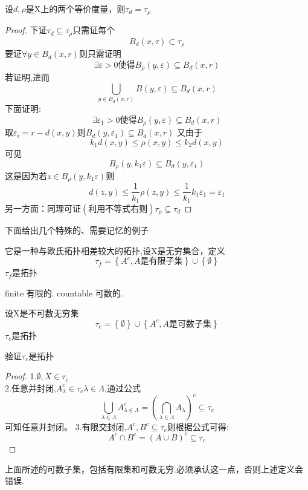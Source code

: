 \begin{corollary}
    设\(d,\rho\)是X上的两个等价度量，则\(\tau_{d}=\tau_{\rho}\)
\end{corollary}
\begin{proof}
    下证\(\tau_{d}\subseteq {\tau}_{\rho}\)只需证每个\[B_d(x,\tau) \subset {\tau}_{\rho}\]
    要证\(\forall y \in  B_d(x,r)\)则只需证明
    \[\exists \varepsilon >0 \text{使得} B_{\rho}(y,\varepsilon) \subseteq B_d(x,r)\]
    若证明,进而\[\bigcup_{y \in  B_d(x,r)}B(y,\varepsilon) \subseteq B_d(x,r)\]
    下面证明:
    \[\exists \varepsilon_1 >0 \text{使得} B_{\rho}(y,\varepsilon) \subseteq B_d(x,r)\]
    取\(\varepsilon_i=r-d(x,y)\)则\(B_d(y,\varepsilon_1)\subseteq B_d(x,r)\)
    又由于\[k_1d(x,y) \leq \rho (x,y)\leq k_2d(x,y)\]
    可见
    \[B_{\rho}(y,k_1\varepsilon) \subseteq B_d(y,{\varepsilon_1})\]
    这是因为若\(z \in B_{\rho}(y,k_1\varepsilon)\)则
    \[d(z,y) \leq \frac{1}{k_1}\rho(z,y) \leq \frac{1}{k_1}k_1 \varepsilon_1 =\varepsilon_1\]
    另一方面：同理可证\(\left(利用不等式右则\right)\)\({\tau}_{\rho}\subseteq {\tau}_{d}\)
\end{proof}
下面给出几个特殊的、需要记忆的例子
\begin{example}[余有限拓扑]
    它是一种与欧氏拓扑相差较大的拓扑,设X是无穷集合，定义\[\tau_f=\left\{A^{c},A\text{是有限子集}\right\}\cup \left\{\emptyset\right\}\]
    \(\tau_f\)是拓扑 
\end{example}
\begin{remark}
    finite 有限的. countable 可数的.
\end{remark}
\begin{example}[余可数拓扑]
    设X是不可数无穷集 
    \[\tau_c=\left\{\emptyset\right\}\cup \left\{A^{c},A是可数子集\right\}\]
    \(\tau_c\)是拓扑
\end{example}
\begin{exercise}
    验证\(\tau_c\)是拓扑
\end{exercise}
\begin{proof}
    1.\(\emptyset , X \in \tau_c\) \\
    2.任意并封闭,\(A^{c}_{\lambda} \in \tau_c \lambda \in \Lambda\),通过公式
    \[\bigcup_{\lambda\in\Lambda}A^{c}_{\lambda\in\Lambda}={(\bigcap_{\lambda \in \Lambda}A_{\lambda})^{c}\subseteq \tau_c}\]
    可知任意并封闭。
    3.有限交封闭,\(A^{c},B^{c} \subseteq \tau_c\)则根据公式可得:
    \[A^c\cap B^c={(A \cup B)^{c}} \subseteq \tau_c\]
\end{proof}
\begin{remark}
    上面所述的可数子集，包括有限集和可数无穷.必须承认这一点，否则上述定义会错误.
\end{remark}





